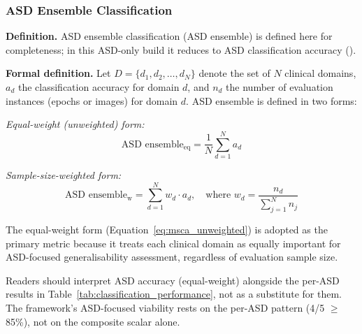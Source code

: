 \subsubsection{ASD Ensemble Classification}

\textbf{Definition.} ASD ensemble classification (ASD ensemble) is defined here for completeness; in this ASD-only build it reduces to ASD classification accuracy (\asdacc{}).


\textbf{Formal definition.} Let $D = \{d_1, d_2, \ldots, d_N\}$ denote the set of $N$ clinical domains, $a_d$ the classification accuracy for domain $d$, and $n_d$ the number of evaluation instances (epochs or images) for domain $d$. ASD ensemble is defined in two forms:

\textit{Equal-weight (unweighted) form:}
\begin{equation}
\label{eq:msca_unweighted}
\text{ASD ensemble}_{\text{eq}} = \frac{1}{N} \sum_{d=1}^{N} a_d
\end{equation}

\textit{Sample-size-weighted form:}
\begin{equation}
\label{eq:msca_weighted}
\text{ASD ensemble}_{\text{w}} = \sum_{d=1}^{N} w_d \cdot a_d, \quad \text{where } w_d = \frac{n_d}{\sum_{j=1}^{N} n_j}
\end{equation}

The equal-weight form (Equation~\ref{eq:msca_unweighted}) is adopted as the primary metric because it treats each clinical domain as equally important for ASD-focused generalisability assessment, regardless of evaluation sample size.

Readers should interpret ASD accuracy (equal-weight) alongside the per-ASD results in Table~\ref{tab:classification_performance}, not as a substitute for them. The framework's ASD-focused viability rests on the per-ASD pattern (4/5 $\geq$ 85\%), not on the composite scalar alone.

